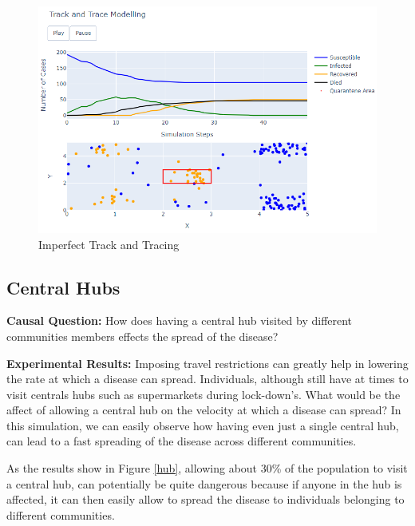 \begin{figure}[ht!]%
    \centering
    \includegraphics[width=13cm]{latex/images/track2.PNG}%
    \caption{Imperfect Track and Tracing}
    \label{track2}
\end{figure}

\subsection{Central Hubs}

\textbf{Causal Question:} How does having a central hub visited by different communities members effects the spread of the disease?

\textbf{Experimental Results:} Imposing travel restrictions can greatly help in lowering the rate at which a disease can spread. Individuals, although still have at times to visit centrals hubs such as supermarkets during lock-down's. What would be the affect of allowing a central hub on the velocity at which a disease can spread? In this simulation, we can easily observe how having even just a single central hub, can lead to a fast spreading of the disease across different communities.

As the results show in Figure \ref{hub}, allowing about 30\% of the population to visit a central hub, can potentially be quite dangerous because if anyone in the hub is affected, it can then easily allow to spread the disease to individuals belonging to different communities. 

